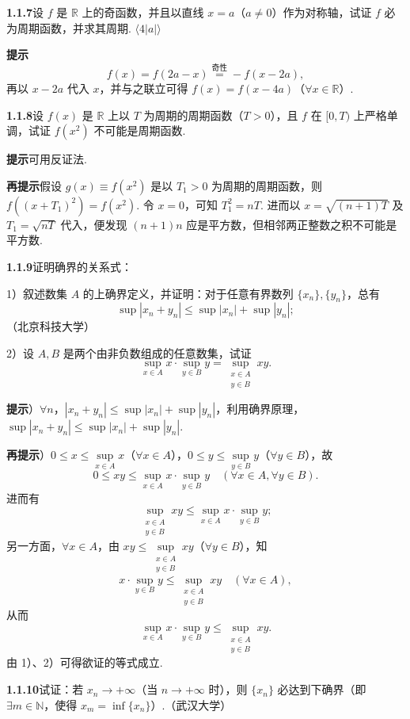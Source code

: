 \documentclass[UTF8, 12pt, fontset=fandol, oneside]{ctexart}
\begin{document}
\noindent\textbf{1.1.7}\quad 设 $f$ 是 $\mathbb{R}$ 上的奇函数，并且以直线 $x=a$（$a\ne0$）作为对称轴，试证 $f$ 必为周期函数，并求其周期. \hfill $\langle4|a|\rangle$

\noindent\textbf{提示}\quad
\[
  f(x)=f(2a-x)\overset{\text{奇性}}{=}-f(x-2a),
\]
再以 $x-2a$ 代入 $x$，并与之联立可得 $f(x)=f(x-4a)$（$\forall x\in\mathbb{R}$）.

\noindent\textbf{1.1.8}\quad 设 $f(x)$ 是 $\mathbb{R}$ 上以 $T$ 为周期的周期函数（$T>0$），且 $f$ 在 $[0,T)$ 上严格单调，试证 $f(x^2)$ 不可能是周期函数.

\noindent\textbf{提示}\quad 可用反证法.

\noindent\textbf{再提示}\quad 假设 $g(x)\equiv f(x^2)$ 是以 $T_1>0$ 为周期的周期函数，则 $f((x+T_1)^2)=f(x^2)$. 令 $x=0$，可知 $T_1^2=nT$. 进而以 $x=\sqrt{(n+1)T}$ 及 $T_1=\sqrt{nT}$ 代入，便发现 $(n+1)n$ 应是平方数，但相邻两正整数之积不可能是平方数.

\noindent\textbf{1.1.9}\quad 证明确界的关系式：

1）叙述数集 $A$ 的上确界定义，并证明：对于任意有界数列 $\{x_n\},\{y_n\}$，总有
\[
  \sup|x_n+y_n|\le \sup|x_n|+\sup|y_n|;
\]
（北京科技大学）

2）设 $A,B$ 是两个由非负数组成的任意数集，试证
\[
  \sup_{x\in A}x\cdot \sup_{y\in B}y=\sup_{\substack{x\in A\\y\in B}}xy.
\]

\noindent\textbf{提示}）$\forall n$，$|x_n+y_n|\le \sup|x_n|+\sup|y_n|$，利用确界原理，$\sup|x_n+y_n|\le \sup|x_n|+\sup|y_n|$.

\noindent\textbf{再提示}）$0\le x\le \sup\limits_{x\in A}x$（$\forall x\in A$），$0\le y\le \sup\limits_{y\in B}y$（$\forall y\in B$），故
\[
  0\le xy\le \sup_{x\in A}x\cdot\sup_{y\in B}y\quad(\forall x\in A,\forall y\in B).
\]
进而有
\[
  \sup_{\substack{x\in A\\y\in B}}xy\le \sup_{x\in A}x\cdot\sup_{y\in B}y;
\tag{1}
\]
另一方面，$\forall x\in A$，由 $xy\le \sup\limits_{\substack{x\in A\\y\in B}}xy$（$\forall y\in B$），知
\[
  x\cdot\sup_{y\in B}y\le \sup_{\substack{x\in A\\y\in B}}xy\quad(\forall x\in A),
\]
从而
\[
  \sup_{x\in A}x\cdot\sup_{y\in B}y\le \sup_{\substack{x\in A\\y\in B}}xy.
\tag{2}
\]
由 1）、2）可得欲证的等式成立.

\noindent\textbf{1.1.10}\quad 试证：若 $x_n\to+\infty$（当 $n\to+\infty$ 时），则 $\{x_n\}$ 必达到下确界（即 $\exists m\in\mathbb{N}$，使得 $x_m=\inf\{x_n\}$）.（武汉大学）
\end{document}
